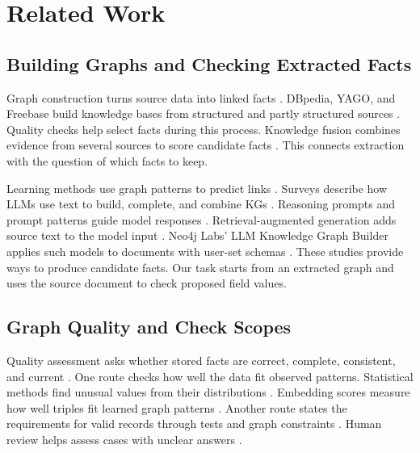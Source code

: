 \section{Related Work}
\label{sec:related_work}

\subsection{Building Graphs and Checking Extracted Facts}

Graph construction turns source data into linked facts \citep{ref_ji2021}.
DBpedia, YAGO, and Freebase build knowledge bases from structured and partly
structured sources \citep{ref_auer2007,ref_suchanek2007,ref_bollacker2008}.
Quality checks help select facts during this process.
Knowledge fusion combines evidence from several sources to score candidate
facts \citep{ref_dong2014}.
This connects extraction with the question of which facts to keep.

Learning methods use graph patterns to predict links
\citep{ref_bordes2013,ref_wang2017,ref_schlichtkrull2018}.
Surveys describe how LLMs use text to build, complete, and combine KGs
\citep{ref_pan2023,ref_pan2025,ref_bian2025}.
Reasoning prompts and prompt patterns guide model responses
\citep{ref_wei2023,ref_white2023}.
Retrieval-augmented generation adds source text to the model input
\citep{ref_lewis2020}.
Neo4j Labs' LLM Knowledge Graph Builder applies such models to documents
with user-set schemas \citep{ref_neo4j_llm_graph_builder}.
These studies provide ways to produce candidate facts.
Our task starts from an extracted graph and uses the source document to
check proposed field values.

\subsection{Graph Quality and Check Scopes}

Quality assessment asks whether stored facts are correct, complete,
consistent, and current \citep{ref_zaveri2016,ref_paulheim2017,ref_wang2021}.
One route checks how well the data fit observed patterns.
Statistical methods find unusual values from their distributions
\citep{ref_wienand2014,ref_paulheim2014}.
Embedding scores measure how well triples fit learned graph patterns
\citep{ref_nickel2016}.
Another route states the requirements for valid records through tests and
graph constraints \citep{ref_kontokostas2014,ref_shacl2017}.
Human review helps assess cases with unclear answers \citep{ref_acosta2013}.

